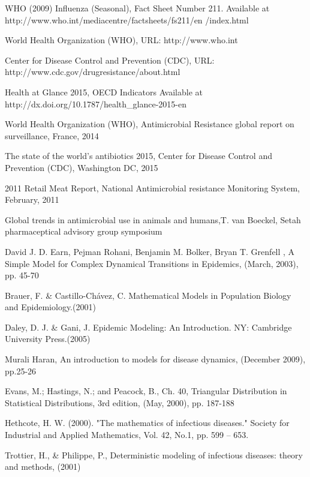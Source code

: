 \begin{thebibliography}{99}

WHO (2009) Influenza (Seasonal), Fact Sheet Number 211. Available at http://www.who.int/mediacentre/factsheets/fs211/en /index.html

World Health Organization (WHO), URL: http://www.who.int

Center for Disease Control and Prevention (CDC), URL: http://www.cdc.gov/drugresistance/about.html

Health at Glance 2015, OECD Indicators Available at http://dx.doi.org/10.1787/health_glance-2015-en

World Health Organization (WHO), Antimicrobial Resistance global report on surveillance, France, 2014

The state of the world’s antibiotics 2015, Center for Disease Control and Prevention (CDC), Washington DC, 2015

2011 Retail Meat Report, National  Antimicrobial resistance Monitoring System, February, 2011

Global trends in antimicrobial use in animals and humans,T. van Boeckel, Setah pharmaceptical advisory group symposium

David J. D. Earn, Pejman Rohani, Benjamin M. Bolker, Bryan T. Grenfell , A Simple Model for Complex Dynamical Transitions in Epidemics, (March, 2003), pp. 45-70

Brauer, F. \& Castillo-Chávez, C. Mathematical Models in Population Biology and Epidemiology.(2001)

Daley, D. J. \& Gani, J. Epidemic Modeling: An Introduction. NY: Cambridge University Press.(2005)

Murali Haran, An introduction to models for disease dynamics, (December 2009), pp.25-26

Evans, M.; Hastings, N.; and Peacock, B., Ch. 40, Triangular Distribution in Statistical Distributions, 3rd edition, (May, 2000), pp. 187-188

Hethcote, H. W. (2000). "The mathematics of infectious diseases." Society for Industrial and Applied Mathematics, Vol. 42, No.1, pp. 599 – 653.

Trottier, H., \& Philippe, P., Deterministic modeling of infectious diseases: theory and methods, (2001)


\end{thebibliography}


